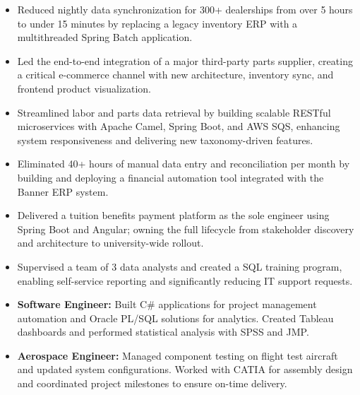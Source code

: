 \begin{itemize}[leftmargin=*]
    \item Reduced nightly data synchronization for 300+ dealerships from over 5 hours to under 15 minutes by replacing a legacy inventory ERP with a multithreaded Spring Batch application.
    \item Led the end-to-end integration of a major third-party parts supplier, creating a critical e-commerce channel with new architecture, inventory sync, and frontend product visualization.
    \item Streamlined labor and parts data retrieval by building scalable RESTful microservices with Apache Camel, Spring Boot, and AWS SQS, enhancing system responsiveness and delivering new taxonomy-driven features.
\end{itemize}
\vspace{\jobGroupBottomMargin}

\begin{itemize}[leftmargin=*]
    \item Eliminated 40+ hours of manual data entry and reconciliation per month by building and deploying a financial automation tool integrated with the Banner ERP system.
    \item Delivered a tuition benefits payment platform as the sole engineer using Spring Boot and Angular; owning the full lifecycle from stakeholder discovery and architecture to university-wide rollout.
    \item Supervised a team of 3 data analysts and created a SQL training program, enabling self-service reporting and significantly reducing IT support requests.
\end{itemize}
\vspace{\jobGroupBottomMargin}

\begin{itemize}[leftmargin=*]
    \item \textbf{Software Engineer:} Built C\# applications for project management automation and Oracle PL/SQL solutions for analytics. Created Tableau dashboards and performed statistical analysis with SPSS and JMP.
    \item \textbf{Aerospace Engineer:} Managed component testing on flight test aircraft and updated system configurations. Worked with CATIA for assembly design and coordinated project milestones to ensure on-time delivery.
\end{itemize}


